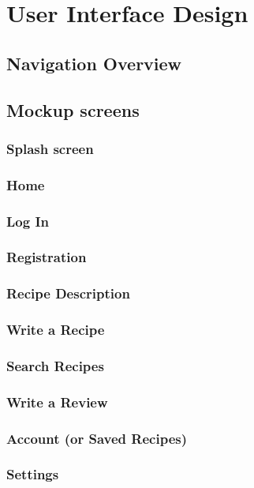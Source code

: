 \chapter{User Interface Design}

\section{Navigation Overview}

\section{Mockup screens}
\subsection{Splash screen}

\subsection{Home}

\subsection{Log In}

\subsection{Registration}

\subsection{Recipe Description}

\subsection{Write a Recipe}

\subsection{Search Recipes}

\subsection{Write a Review}

\subsection{Account (or Saved Recipes)}

\subsection{Settings}
